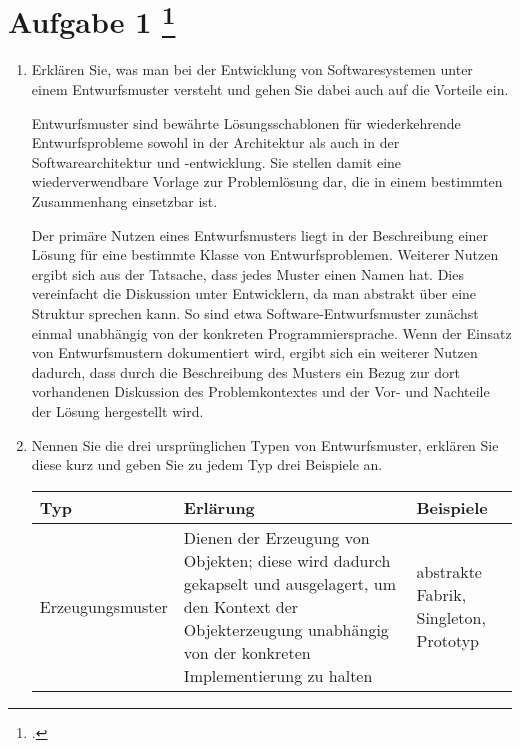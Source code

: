 \documentclass{bschlangaul-aufgabe}
\begin{document}

\section{Aufgabe 1
\footcite{sosy:ab:6}}

\begin{enumerate}


\item Erklären Sie, was man bei der Entwicklung von Softwaresystemen
unter einem Entwurfsmuster versteht und gehen Sie dabei auch auf die
Vorteile ein.

\begin{liAntwort}
Entwurfsmuster sind bewährte Lösungsschablonen für wiederkehrende
Entwurfsprobleme sowohl in der Architektur als auch in der
Softwarearchitektur und -entwicklung. Sie stellen damit eine
wiederverwendbare Vorlage zur Problemlösung dar, die in einem bestimmten
Zusammenhang einsetzbar ist.

Der primäre Nutzen eines Entwurfsmusters liegt in der Beschreibung einer
Lösung für eine bestimmte Klasse von Entwurfsproblemen. Weiterer Nutzen
ergibt sich aus der Tatsache, dass jedes Muster einen Namen hat. Dies
vereinfacht die Diskussion unter Entwicklern, da man abstrakt über eine
Struktur sprechen kann. So sind etwa Software-Entwurfsmuster zunächst
einmal unabhängig von der konkreten Programmiersprache. Wenn der Einsatz
von Entwurfsmustern dokumentiert wird, ergibt sich ein weiterer Nutzen
dadurch, dass durch die Beschreibung des Musters ein Bezug zur dort
vorhandenen Diskussion des Problemkontextes und der Vor- und Nachteile
der Lösung hergestellt wird.
\end{liAntwort}


\item Nennen Sie die drei ursprünglichen Typen von Entwurfsmuster,
erklären Sie diese kurz und geben Sie zu jedem Typ drei Beispiele an.

\begin{liAntwort}

\begin{tabularx}{\linewidth}{p{2cm}|X|p{2cm}}
\textbf{Typ} & \textbf{Erlärung} & \textbf{Beispiele} \\\hline\hline

Erzeugungsmuster &
Dienen der Erzeugung von Objekten; diese wird dadurch gekapselt und
ausgelagert, um den Kontext der Objekterzeugung unabhängig von der
konkreten Implementierung zu halten &
abstrakte Fabrik, Singleton, Prototyp \\\hline


\end{tabularx}
\end{liAntwort}
\end{enumerate}
\end{document}
